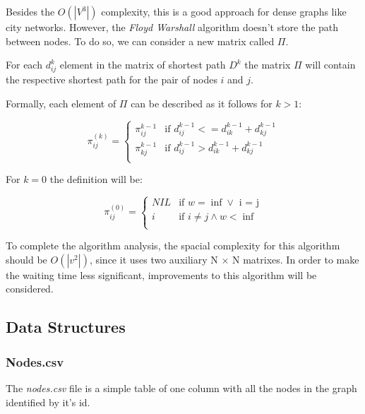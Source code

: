 \documentclass{article}
\begin{document}
    Besides the $O(|V^3|)$ complexity, this is a good approach for dense graphs like city networks.
    However, the \textit{Floyd Warshall} algorithm doesn't store the path between nodes. To do so, we can consider a new matrix called $\Pi$. \par
    For each $d_{ij}^{k}$ element in the matrix of shortest path $D^k$ the matrix $\Pi$ will contain the respective shortest path for the pair of nodes $i$ and $j$. \par
    Formally, each element of $\Pi$ can be described as it follows for $k>1$:

    \begin{equation}
      \pi_{ij}^{(k)} =
        \begin{cases}
          \pi_{ij}^{k-1} & \text{if } d_{ij}^{k-1} <= d_{ik}^{k-1} + d_{kj}^{k-1} \\
          \pi_{kj}^{k-1} & \text{if } d_{ij}^{k-1} > d_{ik}^{k-1} + d_{kj}^{k-1}\\
        \end{cases}
    \end{equation}

    For $k = 0$ the definition will be:

    \begin{equation}
      \pi_{ij}^{(0)} =
        \begin{cases}
          NIL & \text{if } w = \inf \vee \text{ i = j}\\
          i & \text{if } i \neq j \wedge w < \inf\\
        \end{cases}
    \end{equation}

    To complete the algorithm analysis, the spacial complexity for this algorithm should be $O(|v^2|)$, since it uses two auxiliary N $\times$ N matrixes. \newline
    In order to make the waiting time less significant, improvements to this algorithm will be considered.

\subsection*{Data Structures}
\subsubsection*{Nodes.csv}
        The \textit{nodes.csv} file is a simple table of one column with all the nodes in the graph identified by it's id.
\end{document}
